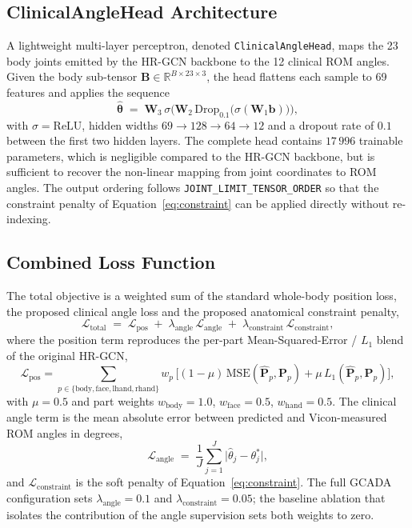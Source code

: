 \subsection{ClinicalAngleHead Architecture}
A lightweight multi-layer perceptron, denoted \texttt{ClinicalAngleHead},
maps the 23 body joints emitted by the HR-GCN backbone to the 12
clinical ROM angles. Given the body sub-tensor
$\mathbf{B}\!\in\!\mathbb{R}^{B\times 23\times 3}$, the head flattens
each sample to 69 features and applies the sequence
\begin{equation}
\hat{\boldsymbol{\theta}} \;=\;
\mathbf{W}_{3}\,\sigma\!\big(\mathbf{W}_{2}\,
\mathrm{Drop}_{0.1}\!\big(\sigma(\mathbf{W}_{1}\mathbf{b})\big)\big),
\label{eq:anglehead}
\end{equation}
with $\sigma\!=\!\mathrm{ReLU}$, hidden widths $69\!\rightarrow\!128
\!\rightarrow\!64\!\rightarrow\!12$ and a dropout rate of $0.1$ between
the first two hidden layers. The complete head contains $17\,996$
trainable parameters, which is negligible compared to the HR-GCN
backbone, but is sufficient to recover the non-linear mapping from
joint coordinates to ROM angles. The output ordering follows
\texttt{JOINT\_LIMIT\_TENSOR\_ORDER} so that the constraint penalty
of Equation~\ref{eq:constraint} can be applied directly without
re-indexing.

\subsection{Combined Loss Function}
The total objective is a weighted sum of the standard whole-body
position loss, the proposed clinical angle loss and the proposed
anatomical constraint penalty,
\begin{equation}
\mathcal{L}_{\mathrm{total}} \;=\;
\mathcal{L}_{\mathrm{pos}} \;+\;
\lambda_{\mathrm{angle}}\,\mathcal{L}_{\mathrm{angle}} \;+\;
\lambda_{\mathrm{constraint}}\,\mathcal{L}_{\mathrm{constraint}},
\label{eq:total-loss}
\end{equation}
where the position term reproduces the per-part Mean-Squared-Error /
$L_{1}$ blend of the original HR-GCN,
\begin{equation}
\mathcal{L}_{\mathrm{pos}} = \!\!\sum_{p\in\{\mathrm{body},\mathrm{face},\mathrm{lhand},\mathrm{rhand}\}}\!\!
w_{p}\,\Big[(1-\mu)\,\mathrm{MSE}(\hat{\mathbf{P}}_{p},\mathbf{P}_{p})
+ \mu\,L_{1}(\hat{\mathbf{P}}_{p},\mathbf{P}_{p})\Big],
\label{eq:pos-loss}
\end{equation}
with $\mu\!=\!0.5$ and part weights $w_{\mathrm{body}}\!=\!1.0$,
$w_{\mathrm{face}}\!=\!0.5$, $w_{\mathrm{hand}}\!=\!0.5$. The clinical
angle term is the mean absolute error between predicted and
Vicon-measured ROM angles in degrees,
\begin{equation}
\mathcal{L}_{\mathrm{angle}} \;=\;
\frac{1}{J}\sum_{j=1}^{J} \big|\hat{\theta}_{j} - \theta^{*}_{j}\big|,
\label{eq:angle-loss}
\end{equation}
and $\mathcal{L}_{\mathrm{constraint}}$ is the soft penalty of
Equation~\ref{eq:constraint}. The full GCADA configuration sets
$\lambda_{\mathrm{angle}}\!=\!0.1$ and
$\lambda_{\mathrm{constraint}}\!=\!0.05$; the baseline ablation that
isolates the contribution of the angle supervision sets both weights
to zero.

